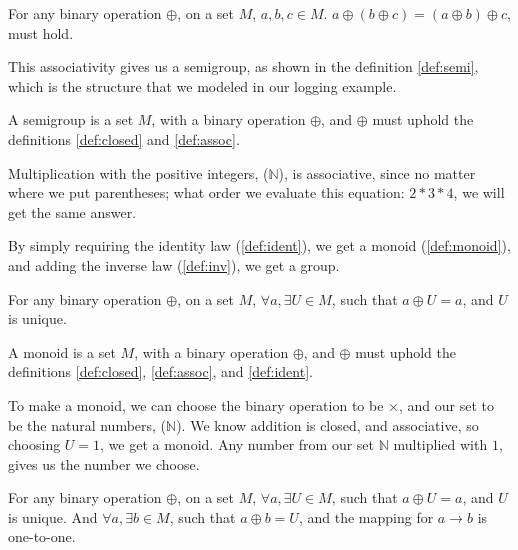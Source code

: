 \begin{definition} \label{def:assoc}
  For any binary operation $\oplus$, on a set $M$, $a, b, c \in M$.
  $a \oplus \left ( b \oplus c \right ) = \left ( a \oplus b \right ) \oplus c$,
  must hold.
\end{definition}

This associativity gives us a semigroup, as shown in the definition
\ref{def:semi}, which is the structure that we modeled in our logging example.

\begin{definition}[Semigroup] \label{def:semi}
  A semigroup is a set $M$, with a binary operation $\oplus$, and $\oplus$ must
  uphold the definitions \ref{def:closed} and \ref{def:assoc}.
\end{definition}

\begin{exmp}
  Multiplication with the positive integers, ($\mathbb{N}$), is associative,
  since no matter where we put parentheses; what order we evaluate this
  equation: $2 * 3 * 4$, we will get the same answer.
\end{exmp}

By simply requiring the identity law (\ref{def:ident}), we get a
monoid (\ref{def:monoid}), and adding the inverse law
(\ref{def:inv}), we get a group.

\begin{definition} \label{def:ident}
  For any binary operation $\oplus$, on a set $M$,
  $\forall a, \exists U \in M$, such that
  $a \oplus U = a$, and $U$ is unique.
\end{definition}

\begin{definition}[Monoid] \label{def:monoid}
  A monoid is a set $M$, with a binary operation $\oplus$, and $\oplus$ must
  uphold the definitions \ref{def:closed}, \ref{def:assoc}, and \ref{def:ident}.
\end{definition}

\begin{exmp}
  To make a monoid, we can choose the binary operation to be $\times$, and our
  set to be the natural numbers, ($\mathbb{N}$). We know addition is closed, and
  associative, so choosing $U = 1$, we get a monoid. Any number from our set
  $\mathbb{N}$ multiplied with $1$, gives us the number we choose.
\end{exmp}

\begin{definition} \label{def:inv}
  For any binary operation $\oplus$, on a set $M$,
  $\forall a, \exists U \in M$, such that
  $a \oplus U = a$, and $U$ is unique.
  And $\forall a, \exists b \in M$, such that $a \oplus b = U$, and the mapping
  for $a \to b$ is one-to-one.
\end{definition}

